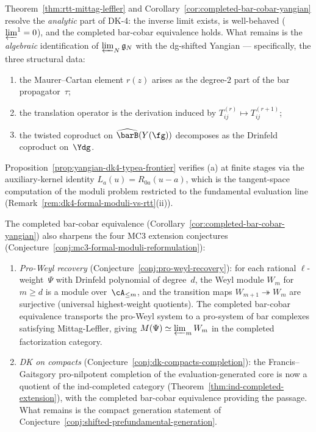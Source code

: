 \begin{remark}
\label{rem:dk4-mittag-leffler}
Theorem~\ref{thm:rtt-mittag-leffler} and
Corollary~\ref{cor:completed-bar-cobar-yangian} resolve the
\emph{analytic} part of DK-4: the inverse limit exists, is
well-behaved ($\varprojlim^1 = 0$), and the completed bar-cobar
equivalence holds.  What remains is the \emph{algebraic}
identification of $\varprojlim_N \mathfrak{g}_N$ with the
dg-shifted Yangian --- specifically, the three structural
data:
\begin{enumerate}[label=\textup{(\alph*)}]
\item the Maurer--Cartan element $r(z)$ arises as the
  degree-$2$ part of the bar propagator~$\tau$;
\item the translation operator is the derivation induced by
  $T_{ij}^{(r)} \mapsto T_{ij}^{(r+1)}$;
\item the twisted coproduct on $\widehat{\barB}(Y(\fg))$
  decomposes as the Drinfeld coproduct on~$\Ydg$.
\end{enumerate}
Proposition~\ref{prop:yangian-dk4-typea-frontier} verifies
(a) at finite stages via the auxiliary-kernel identity
$L_a(u) = R_{0a}(u - a)$, which is the tangent-space
computation of the moduli problem restricted to the
fundamental evaluation line
(Remark~\ref{rem:dk4-formal-moduli-vs-rtt}(ii)).

The completed bar-cobar equivalence
(Corollary~\ref{cor:completed-bar-cobar-yangian}) also sharpens
the four MC3 extension conjectures
(Conjecture~\ref{conj:mc3-formal-moduli-reformulation}):
\begin{enumerate}[label=\textup{(\roman*)}]
\item \emph{Pro-Weyl recovery}
  \textup{(}Conjecture~\ref{conj:pro-weyl-recovery}\textup{)}:
  for each rational $\ell$-weight~$\Psi$ with Drinfeld
  polynomial of degree~$d$, the Weyl module $W_m$ for
  $m \geq d$ is a module over~$\cA_{\leq m}$, and
  the transition maps $W_{m+1} \twoheadrightarrow W_m$ are
  surjective (universal highest-weight quotients).
  The completed bar-cobar equivalence transports the
  pro-Weyl system to a pro-system of bar complexes
  satisfying Mittag-Leffler, giving
  $M(\Psi) \simeq \varprojlim_m W_m$ in the completed
  factorization category.

\item \emph{DK on compacts}
  \textup{(}Conjecture~\ref{conj:dk-compacts-completion}\textup{)}:
  the Francis--Gaitsgory pro-nilpotent completion of the
  evaluation-generated core is now a quotient of the
  ind-completed category
  (Theorem~\ref{thm:ind-completed-extension}), with the
  completed bar-cobar equivalence providing the passage.
  What remains is the compact generation statement of
  Conjecture~\ref{conj:shifted-prefundamental-generation}.
\end{enumerate}
\end{remark}

